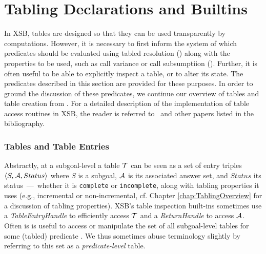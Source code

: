 
\newcommand{\retn}{\code{ret/n}}


\section{Tabling Declarations and Builtins} \label{sec:TablingPredicates}

In XSB, tables are designed so that they can be used transparently by
computations.  However, it is necessary to first inform the system of
which predicates should be evaluated using tabled resolution
() along with the properties to be used,
such as call variance or call subsumptiion
().  Further, it is often useful to be
able to explicitly inspect a table, or to alter its state.  The
predicates described in this section are provided for these purposes.
In order to ground the discussion of these predicates, we continue our
overview of tables and table creation from
.  For a detailed description of the
implementation of table access routines in XSB, the reader is referred
to~\cite{RRSSW98,TST99,CuSW99b,Swif14} and other papers listed in the
bibliography.


\subsubsection*{Tables and Table Entries}

Abstractly, at a subgoal-level a table ${\cal T}$ can be seen as a set of
entry triples $\langle S,{\cal A},Status \rangle$ where $S$ is a subgoal,
${\cal A}$ is its associated answer set, and $Status$ its
status~---~whether it is \texttt{complete} or \texttt{incomplete},
along with tabling properties it uses (e.g., incremental or
non-incremental, cf. Chapter \ref{chap:TablingOverview} for a
discussion of tabling properties).  XSB's table inspection built-ins
sometimes use a {\em TableEntryHandle} to efficiently access ${\cal T}$ and
a {\em ReturnHandle} to access ${\cal A}$.  Often is is useful to access or
manipulate the set of all subgoal-level tables for some (tabled)
predicate .  We thus sometimes abuse terminology slightly by
referring to this set as a {\em predicate-level} table.

